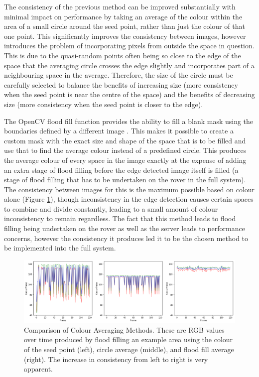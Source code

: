 The consistency of the previous method can be improved substantially with minimal impact on performance by taking an average of the colour within the area of a small circle around the seed point, rather than just the colour of that one point. This significantly improves the consistency between images, however introduces the problem of incorporating pixels from outside the space in question. This is due to the quasi-random points often being so close to the edge of the space that the averaging circle crosses the edge slightly and incorporates part of a neighbouring space in the average. Therefore, the size of the circle must be carefully selected to balance the benefits of increasing size (more consistency when the seed point is near the centre of the space) and the benefits of decreasing size (more consistency when the seed point is closer to the edge). 

The OpenCV flood fill function provides the ability to fill a blank mask using the boundaries defined by a different image \cite{bradski2008learning}. This makes it possible to create a custom mask with the exact size and shape of the space that is to be filled and use that to find the average colour instead of a predefined circle. This produces the average colour of every space in the image exactly at the expense of adding an extra stage of flood filling before the edge detected image itself is filled (a stage of flood filling that has to be undertaken on the rover in the full system). The consistency between images for this is the maximum possible based on colour alone (Figure \ref{fig:ColourConsistency}), though inconsistency in the edge detection causes certain spaces to combine and divide constantly, leading to a small amount of colour inconsistency to remain regardless. The fact that this method leads to flood filling being undertaken on the rover as well as the server leads to performance concerns, however the consistency it produces led it to be the chosen method to be implemented into the full system.

\begin{figure}[H]
    \begin{center}
      \includegraphics[width=1\textwidth]{Figures/ColourConsistency.png}
      \caption[Comparison of Colour Averaging Methods]{Comparison of Colour Averaging Methods. These are RGB values over time produced by flood filling an example area using the colour of the seed point (left), circle average (middle), and flood fill average (right). The increase in consistency from left to right is very apparent.}
      \label{fig:ColourConsistency}
    \end{center}
\end{figure}